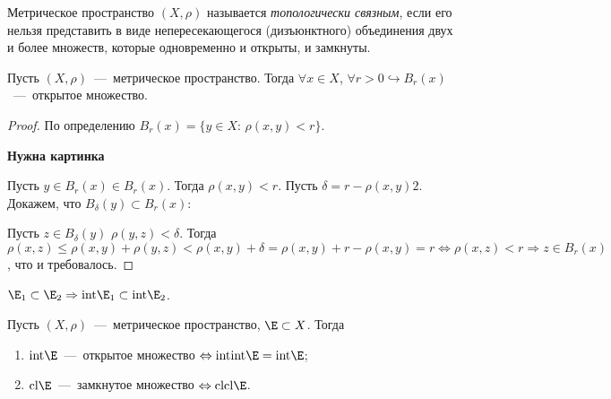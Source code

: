 \begin{definition}
    Метрическое пространство $(X, \rho)$ называется \textit{топологически связным}, если его нельзя представить в виде непересекающегося (дизъюнктного) объединения двух и более множеств, которые одновременно и открыты, и замкнуты.
\end{definition}
\begin{lemma}
    \hypertarget{lemm7.1}{Пусть $(X, \rho)$~---~метрическое пространство. Тогда $\forall x \in X$, $\forall r > 0 \hookrightarrow B_{r} (x)$~---~открытое множество.}
\end{lemma}
\begin{proof}
    По определению $B_{r} (x) = \{ y \in X$: $\rho(x, y) < r \}$.

    \textbf{Нужна картинка}

    Пусть $y \in B_{r} (x) \in B_{r} (x)$. Тогда $\rho(x, y) < r$. Пусть $\delta = r - \rho(x, y)2$. Докажем, что $B_{\delta} (y) \subset B_{r} (x)$:

    Пусть $z \in B_{\delta} (y)$ $\rho(y, z) < \delta$. Тогда $\rho(x, z) \leq \rho(x, y) + \rho(y, z) < \rho(x, y) + \delta = \rho(x, y) + r - \rho(x, y) = r \Leftrightarrow \rho(x, z) < r \Rightarrow z \in B_{r} (x)$, что и требовалось.
\end{proof}
\begin{proposition}
    $\E_{1} \subset \E_{2} \Rightarrow \text{int}\E_{1} \subset \text{int}\E_{2}$.
\end{proposition}
\begin{theorem}
    Пусть $(X, \rho)$~---~метрическое пространство, $\E \subset X$. Тогда
    \begin{enumerate}
        \item $\text{int}\E$~---~открытое множество $\Leftrightarrow \text{int}\text{int}\E = \text{int}\E$;
        \item $\text{cl}\E$~---~замкнутое множество $\Leftrightarrow\text{cl}\text{cl}\E$.
    \end{enumerate}
\end{theorem}
